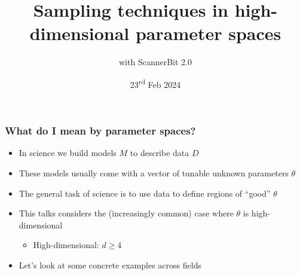 \documentclass[aspectratio=169]{beamer}
\title{Sampling techniques in high-dimensional parameter spaces}
\subtitle{with ScannerBit 2.0}
\date{23\textsuperscript{rd} Feb 2024}
\begin{document}
\begin{frame}
    \titlepage
\end{frame}

\begin{frame}
    \frametitle{What do I mean by parameter spaces?}
    \begin{itemize}
        \item In science we build models $M$ to describe data $D$
        \item These models usually come with a vector of tunable unknown parameters $\theta$
        \item The general task of science is to use data to define regions of ``good'' $\theta$
        \item This talks considers the (increasingly common) case where $\theta$ is high-dimensional
            \begin{itemize}
                \item High-dimensional: $d\ge4$
            \end{itemize}
        \item Let's look at some concrete examples across fields
    \end{itemize}
\end{frame}
\end{document}
